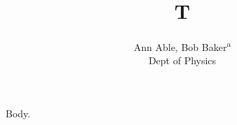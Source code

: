 \documentclass{article}
\title{T}
\author{Ann Able\footremember{a}{Univ X.}, Bob Baker\textsuperscript{a}\\ Dept of Physics}
\begin{document}
\maketitle Body.
\end{document}

